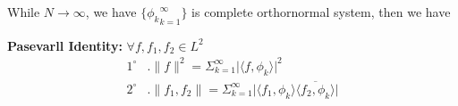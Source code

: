 \documentclass{Math_Note}
\begin{document}
While $N \to \infty$, we have $\{{\phi_{k}}_{k=1}^{\infty}\}$ is complete orthornormal system, then we have

\begin{thm}[Tech]
    \textbf{Pasevarll Identity:} $\forall f, f_{1},f_{2} \in L^{2}$
    \begin{equation}
        \begin{aligned}
            1^{\circ}&. \parallel{f}\parallel^{2} = \Sigma_{k=1}^{\infty}\lvert{\langle f,\phi_{k} \rangle}\rvert^{2} \\
            2^{\circ}&. \parallel{f_{1},f_{2}}\parallel = \Sigma_{k=1}^{\infty}\lvert{\langle f_{1},\phi_{k} \rangle}\overline{\langle f_{2},\phi_{k} \rangle}\rvert
        \end{aligned}
    \end{equation}
\end{thm}
\end{document}
